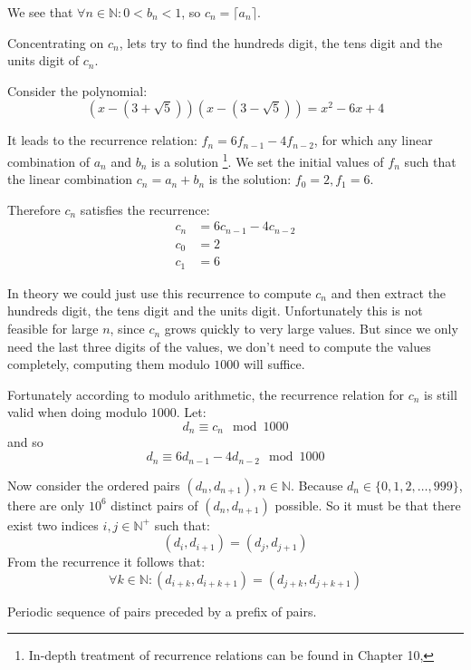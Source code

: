 \noindent We see that $\forall n \in \mathbb{N}: 0 < b_n < 1$, so $c_n=\lceil a_n \rceil$.

Concentrating on $c_n$, lets try to find the hundreds digit, the tens digit and the units digit of $c_n$.

Consider the polynomial:
\[
	(x - (3 + \sqrt{5})) (x - (3 - \sqrt{5})) = x^2 - 6x + 4
\]

\noindent It leads to the recurrence relation: $f_n = 6 f_{n-1} - 4 f_{n-2}$, for which any linear combination of  $a_n$ and $b_n$ is a solution \footnote{In-depth treatment of recurrence relations can be found in Chapter 10, }. We set the initial values of $f_n$ such that the linear combination $c_n=a_n + b_n$ is the solution: $f_0=2, f_1=6$.

\noindent Therefore $c_n$ satisfies the recurrence:
\[
\begin{split}
	c_n & = 6 c_{n-1} - 4 c_{n -2} \\
	c_0 & = 2 \\
	c_1 & = 6
\end{split}
\]

In theory we could just use this recurrence to compute $c_n$ and then extract the hundreds digit, the tens digit and the units digit. Unfortunately this is not feasible for large $n$, since $c_n$ grows quickly to very large values. But since we only need the last three digits of the values,  we don't need to compute the values completely, computing them modulo $1000$ will suffice. 

Fortunately according to modulo arithmetic, the recurrence relation for $c_n$ is still valid when doing modulo $1000$. Let:
\[
	d_n \equiv c_n \mod{1000}
\]
and so
\[
	d_n \equiv 6 d_{n-1} - 4 d_{n -2} \mod{1000}
\]	 

\noindent Now consider the ordered pairs $(d_n, d_{n+1}), n \in \mathbb{N}$. Because $d_n \in \{0, 1, 2, \ldots, 999\}$, there are only $10^6$ distinct pairs of $(d_n, d_{n+1})$ possible. So it must be that there exist two indices $i, j \in \mathbb{N}^+$ such that:
\[
	(d_i, d_{i+1}) = (d_j, d_{j+1})
\]
\noindent From the recurrence it  follows that:
\[
	\forall k \in \mathbb{N}: (d_{i+k}, d_{i + k + 1}) = (d_{j + k}, d_{j + k + 1})
\]

\begin{marginfigure}[1.0in]
\caption{Periodic sequence of pairs preceded by a prefix of pairs.}
\label{fig:looppairs}
\end{marginfigure}

